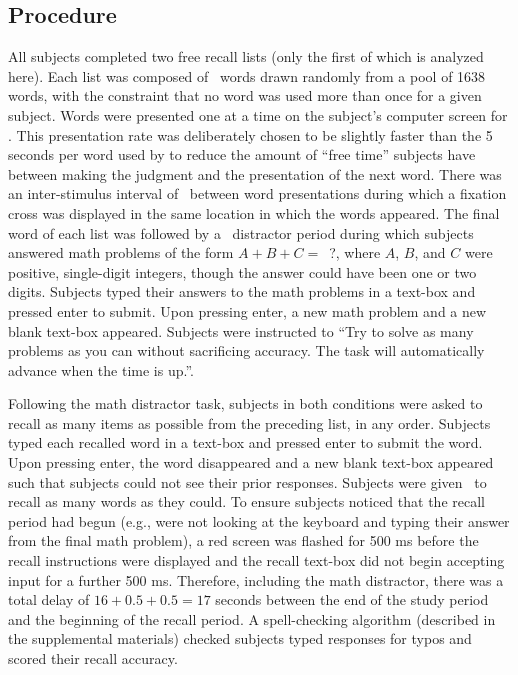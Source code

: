 \documentclass[man,natbib,floatsintext]{apa6} %
\begin{document}
\subsection{Procedure}
All subjects completed two free recall lists (only the first of which is analyzed here). Each list was composed of \listlength~words drawn randomly from a pool of 1638 words, with the constraint that no word was used more than once for a given subject. Words were presented one at a time on the subject's computer screen for \presrate. This presentation rate was deliberately chosen to be slightly faster than the 5 seconds per word used by \citet{NairEtal17} to reduce the amount of ``free time'' subjects have between making the judgment and the presentation of the next word.
There was an inter-stimulus interval of \isi~between word presentations during which a fixation cross was displayed in the same location in which the words appeared. The final word of each list was followed by a \DFRDelay~distractor period during which subjects answered math problems of the form $A+B+C=$~?, where $A$, $B$, and $C$ were positive, single-digit integers, though the answer could have been one or two digits. Subjects typed their answers to the math problems in a text-box and pressed enter to submit. Upon pressing enter, a new math problem and a new blank text-box appeared. Subjects were instructed to ``Try to solve as many problems as you can without sacrificing accuracy. The task will automatically advance when the time is up.''.

Following the math distractor task, subjects in both conditions were asked to recall as many items as possible from the preceding list, in any order. Subjects typed each recalled word in a text-box and pressed enter to submit the word. Upon pressing enter, the word disappeared and a new blank text-box appeared such that subjects could not see their prior responses. Subjects were given \recalltime~to recall as many words as they could. To ensure subjects noticed that the recall period had begun (e.g., were not looking at the keyboard and typing their answer from the final math problem), a red screen was flashed for 500 ms before the recall instructions were displayed and the recall text-box did not begin accepting input for a further 500 ms. Therefore, including the math distractor, there was a total delay of $16+0.5+0.5=17$ seconds between the end of the study period and the beginning of the recall period. A spell-checking algorithm (described in the supplemental materials) checked subjects typed responses for typos and scored their recall accuracy.
\end{document}
